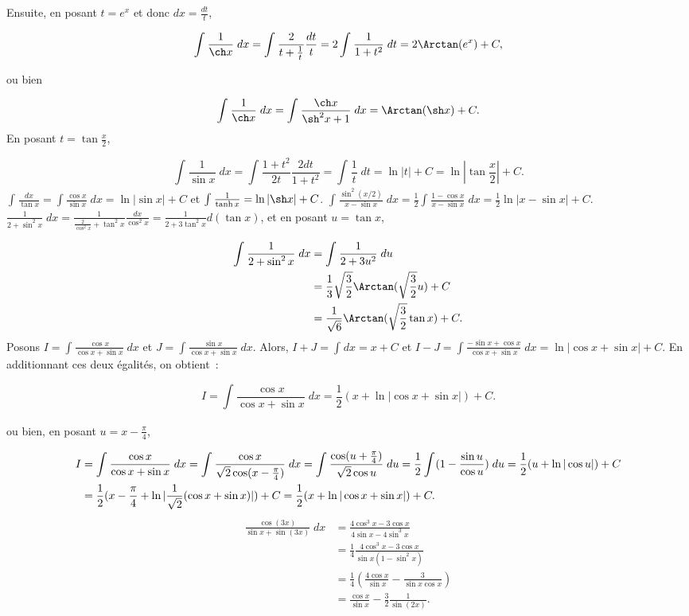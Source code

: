 {{Ensuite, en posant $t=e^x$ et donc $dx=\frac{dt}{t}$,

$$\int_{}^{}\frac{1}{\ch x}\;dx
=\int_{}^{}\frac{2}{t+\frac{1}{t}}\frac{dt}{t}=2\int_{}^{}\frac{1}{1+t^2}\;dt=2\Arctan(e^x)+C,$$

ou bien

$$\int_{}^{}\frac{1}{\ch x}\;dx
=\int_{}^{}\frac{\ch x}{\sh^2x+1}\;dx=\Arctan(\sh x)+C.$$
En posant $t=\tan\frac{x}{2}$,

$$\int_{}^{}\frac{1}{\sin x}\;dx=\int_{}^{}\frac{1+t^2}{2t}\frac{2dt}{1+t^2}=\int_{}^{}\frac{1}{t}\;dt=\ln|t|+C=\ln|\tan\frac{x}{2}|+C.$$
$\int_{}^{}\frac{dx}{\tan x}=\int_{}^{}\frac{\cos x}{\sin x}\;dx=\ln|\sin x|+C$ et $\int_{}^{}\frac{1}{\tanh x}=\ln|\sh x|+C$.
$\int_{}^{}\frac{\sin^2(x/2)}{x-\sin x}\;dx=\frac{1}{2}\int_{}^{}\frac{1-\cos x}{x-\sin x}\;dx=\frac{1}{2}\ln|x-\sin x|+C$.
$\frac{1}{2+\sin^2x}\;dx=\frac{1}{\frac{2}{\cos^2x}+\tan^2x}\frac{dx}{\cos^2x}=\frac{1}{2+3\tan^2x}d(\tan x)$, et en posant $u=\tan x$,

\begin{align*}
\int_{}^{}\frac{1}{2+\sin^2x}\;dx &= \int_{}^{}\frac{1}{2+3u^2}\;du \\
&= \frac{1}{3}\sqrt{\frac{3}{2}}\Arctan(\sqrt{\frac{3}{2}}u)+C \\
&= \frac{1}{\sqrt{6}}\Arctan(\sqrt{\frac{3}{2}}\tan x)+C.
\end{align*}
Posons $I=\int_{}^{}\frac{\cos x}{\cos x+\sin x}\;dx$ et $J=\int_{}^{}\frac{\sin x}{\cos x+\sin x}\;dx$. Alors, $I+J=\int_{}^{}dx=x+C$ et $I-J=\int_{}^{}\frac{-\sin x+\cos x}{\cos x+\sin x}\;dx=\ln|\cos x+\sin x|+C$. En additionnant ces deux égalités, on obtient~:

$$I=\int_{}^{}\frac{\cos x}{\cos x+\sin x}\;dx=\frac{1}{2}(x+\ln|\cos x+\sin x|)+C.$$

ou bien, en posant $u=x-\frac{\pi}{4}$,

\begin{align*}\ensuremath
I&=\int_{}^{}\frac{\cos x}{\cos x+\sin x}\;dx=\int_{}^{}\frac{\cos x}{\sqrt{2}\cos(x-\frac{\pi}{4})}\;dx
=\int_{}^{}\frac{\cos(u+\frac{\pi}{4})}{\sqrt{2}\cos u}\;du=\frac{1}{2}\int_{}^{}(1-\frac{\sin u}{\cos u})\;du
=\frac{1}{2}(u+\ln|\cos u|)+C\\
 &=\frac{1}{2}(x-\frac{\pi}{4}+\ln|\frac{1}{\sqrt{2}}(\cos x+\sin x)|)+C=\frac{1}{2}(x+\ln|\cos x+\sin x|)+C.
\end{align*}
\begin{align*}
\frac{\cos(3x)}{\sin x+\sin(3x)}\;dx &= \frac{4\cos^3x-3\cos x}{4\sin x-4\sin^3x} \\
&= \frac{1}{4}\frac{4\cos^3x-3\cos x}{\sin x(1-\sin^2x)} \\
&= \frac{1}{4}(\frac{4\cos x}{\sin x}-\frac{3}{\sin x\cos x}) \\
&= \frac{\cos x}{\sin x}-\frac{3}{2}\frac{1}{\sin(2x)}.
\end{align*}

}}
